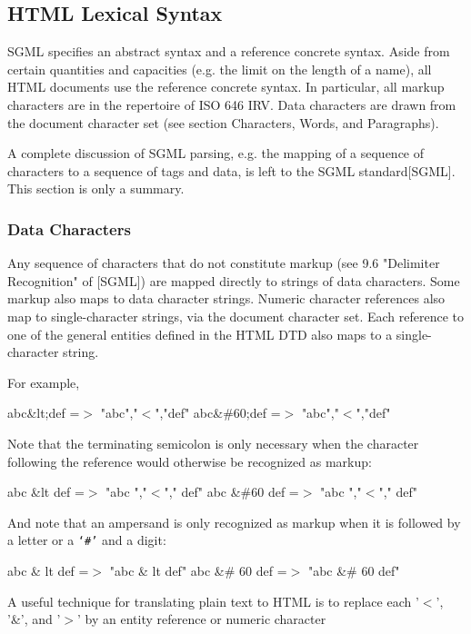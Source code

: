 \subsection*{HTML Lexical Syntax}\par 
SGML specifies an abstract syntax and a reference concrete
syntax.  Aside from certain quantities and capacities (e.g.  the limit
on the length of a name), all HTML documents use the reference
concrete syntax.  In particular, all markup characters are in the
repertoire of ISO 646 IRV.  Data characters are drawn from the document
character set (see section Characters, Words, and Paragraphs).
\par \par 
A complete discussion of SGML parsing, e.g.  the mapping of a sequence
of characters to a sequence of tags and data, is left to the SGML
standard[SGML].  This section is only a summary.
\par \subsubsection*{Data Characters}\par 
Any sequence of characters that do not constitute markup (see
9.6 "Delimiter Recognition" of [SGML]) are mapped directly to
strings of data characters.  Some markup also maps to data character
strings.  Numeric character references also map to single-character
strings, via the document character set.  Each reference to one of the
general entities defined in the HTML DTD also maps to a
single-character string.
\par \par 
For example,
\par abc\&lt;def    =$>$ "abc","$<$","def"
abc\&\#60;def   =$>$ "abc","$<$","def"
\par 
Note that the terminating semicolon is only necessary when the
character following the reference would otherwise be recognized as
markup:
\par abc \&lt def     =$>$ "abc ","$<$"," def"
abc \&\#60 def    =$>$ "abc ","$<$"," def"
\par 
And note that an ampersand is only recognized as markup when it
is followed by a letter or a {\tt `\#'} and a digit:
\par abc \& lt def    =$>$ "abc \& lt def"
abc \&\# 60 def    =$>$ "abc \&\# 60 def"
\par 
A useful technique for translating plain text to HTML is to replace
each '$<$', '\&', and '$>$' by an entity reference or numeric character
